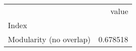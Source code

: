 \begin{tabular}{lr}
\toprule
{} &     value \\
Index                   &           \\
\midrule
Modularity (no overlap) &  0.678518 \\
\bottomrule
\end{tabular}

